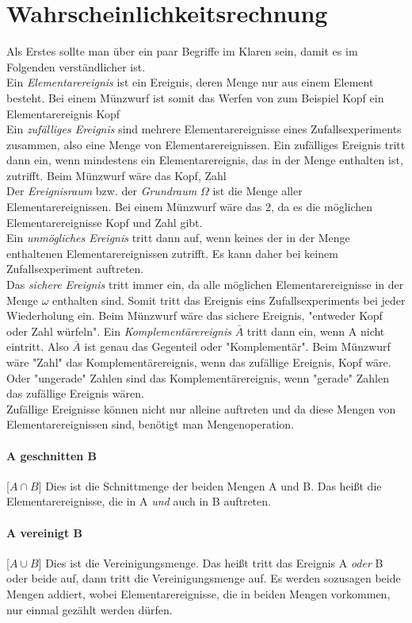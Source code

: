 \documentclass[a4paper]{article}
\begin{document}
\section{Wahrscheinlichkeitsrechnung}
Als Erstes sollte man über ein paar Begriffe im Klaren sein, damit es im Folgenden verständlicher ist.\\
Ein \textit{Elementarereignis} ist ein Ereignis, deren Menge nur aus einem Element besteht. Bei einem Münzwurf ist somit das Werfen von zum Beispiel Kopf ein Elementarereignis {Kopf}\\
Ein \textit{zufälliges Ereignis} sind mehrere Elementarereignisse eines Zufallsexperiments zusammen, also eine Menge von Elementarereignissen. Ein zufälliges Ereignis tritt dann ein, wenn mindestens ein Elementarereignis, das in der Menge enthalten ist, zutrifft. Beim Münzwurf wäre das {Kopf, Zahl}\\
Der \textit{Ereignisraum} bzw. der \textit{Grundraum} $\Omega$ ist die Menge aller Elementarereignissen. Bei einem Münzwurf wäre das 2, da es die möglichen Elementarereignisse Kopf und Zahl gibt.\\
Ein \textit{unmögliches Ereignis} tritt dann auf, wenn keines der in der Menge enthaltenen Elementarereignissen zutrifft. Es kann daher bei keinem Zufallsexperiment auftreten.\\
Das \textit{sichere Ereignis} tritt immer ein, da alle möglichen Elementarereignisse in der Menge $\omega$ enthalten sind. Somit tritt das Ereignis eins Zufallsexperiments bei jeder Wiederholung ein. Beim Münzwurf wäre das sichere Ereignis, "entweder Kopf oder Zahl würfeln".
Ein \textit{Komplementärereignis} $\bar A$ tritt dann ein, wenn A nicht eintritt. Also $\bar A$ ist genau das Gegenteil oder "Komplementär". Beim Münzwurf wäre "Zahl" das Komplementärereignis, wenn das zufällige Ereignis, {Kopf} wäre. Oder "ungerade" Zahlen sind das Komplementärereignis, wenn "gerade" Zahlen das zufällige Ereignis wären.\\
\noindent Zufällige Ereignisse können nicht nur alleine auftreten und da diese Mengen von Elementarereignissen sind, benötigt man Mengenoperation.

\paragraph{A geschnitten B} [$A\cap B$] Dies ist die Schnittmenge der beiden Mengen A und B. Das heißt die Elementarereignisse, die in A \textit{und} auch in B auftreten.

\paragraph{A vereinigt B} [$A \cup B$] Dies ist die Vereinigungsmenge. Das heißt tritt das Ereignis A \textit{oder} B oder beide auf, dann tritt die Vereinigungsmenge auf. Es werden sozusagen beide Mengen addiert, wobei Elementarereignisse, die in beiden Mengen vorkommen, nur einmal gezählt werden dürfen.
\end{document}
